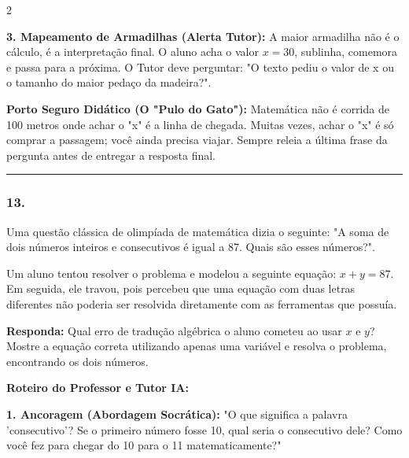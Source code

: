 \begin{multicols*}{2}
\begin{tcolorbox}[colback=CorTitUm!5, colframe=CorTitUm, boxrule=1pt, arc=4pt, left=6pt, right=6pt, top=6pt, bottom=6pt]
    \textbf{3. Mapeamento de Armadilhas (Alerta Tutor):} A maior armadilha não é o cálculo, é a interpretação final. O aluno acha o valor $x = 30$, sublinha, comemora e passa para a próxima. O Tutor deve perguntar: "O texto pediu o valor de x ou o tamanho do maior pedaço da madeira?".
    \end{tcolorbox}
    \vspace{0.15cm}
    
    \begin{boxexplicacao}
    \textbf{Porto Seguro Didático (O "Pulo do Gato"):} Matemática não é corrida de 100 metros onde achar o "x" é a linha de chegada. Muitas vezes, achar o "x" é só comprar a passagem; você ainda precisa viajar. Sempre releia a última frase da pergunta antes de entregar a resposta final.
    \end{boxexplicacao}
\fi

\par\vspace{\espacoQuestao}


\noindent\textcolor{CorLinha}{\rule{\linewidth}{0.5pt}}
\par\vspace{\espacoPreQuestao}
\subsubsection*{13.} 
\begin{enunciadoLiteral}
Uma questão clássica de olimpíada de matemática dizia o seguinte: "A soma de dois números inteiros e consecutivos é igual a 87. Quais são esses números?".

Um aluno tentou resolver o problema e modelou a seguinte equação: $x + y = 87$. Em seguida, ele travou, pois percebeu que uma equação com duas letras diferentes não poderia ser resolvida diretamente com as ferramentas que possuía.

\begin{boxresponda}
\textbf{Responda:} Qual erro de tradução algébrica o aluno cometeu ao usar $x$ e $y$? Mostre a equação correta utilizando apenas uma variável e resolva o problema, encontrando os dois números.
\end{boxresponda}
\end{enunciadoLiteral}

\ifgabarito
    \begin{tcolorbox}[colback=CorTitUm!5, colframe=CorTitUm, boxrule=1pt, arc=4pt, left=6pt, right=6pt, top=6pt, bottom=6pt]
    \small\textbf{\textcolor{CorTitUm}{Roteiro do Professor e Tutor IA:}}\par\vspace{0.1cm}
    \color{CinzaEscuro}
    \textbf{1. Ancoragem (Abordagem Socrática):} "O que significa a palavra 'consecutivo'? Se o primeiro número fosse 10, qual seria o consecutivo dele? Como você fez para chegar do 10 para o 11 matematicamente?"\par\vspace{0.1cm}
    

\end{tcolorbox}
\end{multicols*}
